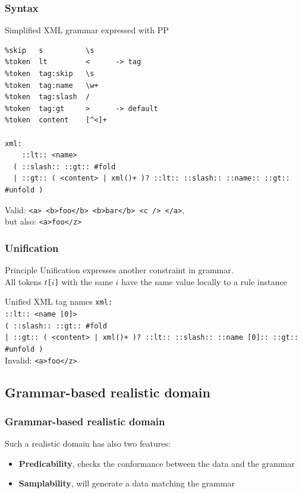 \documentclass[9pt]{beamer}
\newcommand{\red}[1]{{\color{myred} #1}}
\newcommand{\code}[1]{\texttt{#1}}
\begin{document}
\begin{frame}[fragile]
\frametitle{Syntax}

\begin{exampleblock}{Simplified XML grammar expressed with PP}
{
\footnotesize
\begin{verbatim}
%skip   s          \s
%token  lt         <      -> tag
%token  tag:skip   \s
%token  tag:name   \w+
%token  tag:slash  /
%token  tag:gt     >      -> default
%token  content    [^<]+

xml:
    ::lt:: <name>
  ( ::slash:: ::gt:: #fold
  | ::gt:: ( <content> | xml()+ )? ::lt:: ::slash:: ::name:: ::gt:: #unfold )
\end{verbatim}
}
Valid: \code{<a> <b>foo</b> <b>bar</b> <c /> </a>}, \\
but also: \code{<a>foo</z>}
\end{exampleblock}

\end{frame}

\begin{frame}[fragile]
\frametitle{Unification}

\begin{block}{Principle}
Unification expresses another constraint in grammar. \\
All tokens $t$\code{[}$i$\code{]} with the same $i$ have the same value locally
to a rule instance
\end{block}

\begin{exampleblock}{Unified XML tag names}
{
\footnotesize
\code{xml:} \\
\code{\quad\quad::lt:: <name\red{[0]}>} \\
\code{\quad( ::slash:: ::gt:: \#fold} \\
\code{\quad| ::gt:: ( <content> | xml()+ )? ::lt:: ::slash:: ::name\red{[0]}:: ::gt:: \#unfold )} \\
}
Invalid: \code{<a>foo</z>}
\end{exampleblock}

\end{frame}

\subsection{Grammar-based realistic domain}

\begin{frame}
\frametitle{Grammar-based realistic domain}

Such a realistic domain has also two features:
\begin{itemize}
\item[\Square] \textbf{Predicability}, checks the conformance between the
data and the grammar
\item[\Square] \textbf{Samplability}, will generate a data matching the grammar
\end{itemize}

\end{frame}
\end{document}

